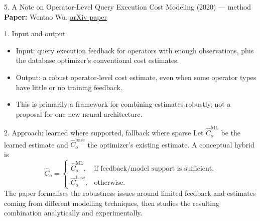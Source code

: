 \documentclass[aspectratio=169,10pt]{beamer}
\newcommand{\paperlink}[2]{\href{#1}{\textcolor{WayangTeal}{\underline{#2}}}}
\begin{document}
\begin{frame}[shrink=10]{5. A Note on Operator-Level Query Execution Cost Modeling (2020) — method}
\small
\textbf{Paper:} Wentao Wu. \hfill\paperlink{https://arxiv.org/abs/2003.04410}{arXiv paper}

\begin{block}{1. Input and output}
\begin{itemize}\setlength\itemsep{1pt}
  \item Input: query execution feedback for operators with enough observations, plus the database optimizer's conventional cost estimates.
  \item Output: a robust operator-level cost estimate, even when some operator types have little or no training feedback.
  \item This is primarily a framework for combining estimates robustly, not a proposal for one new neural architecture.
\end{itemize}
\end{block}

\begin{block}{2. Approach: learned where supported, fallback where sparse}
Let $\widehat C^{\mathrm{ML}}_o$ be the learned estimate and $\widehat C^{\mathrm{base}}_o$ the optimizer's existing estimate. A conceptual hybrid is
\[
\widehat C_o=\begin{cases}
\widehat C^{\mathrm{ML}}_o,&\text{if feedback/model support is sufficient},\\
\widehat C^{\mathrm{base}}_o,&\text{otherwise.}
\end{cases}
\]
The paper formalises the robustness issues around limited feedback and estimates coming from different modelling techniques, then studies the resulting combination analytically and experimentally.
\end{block}
\end{frame}
\end{document}
